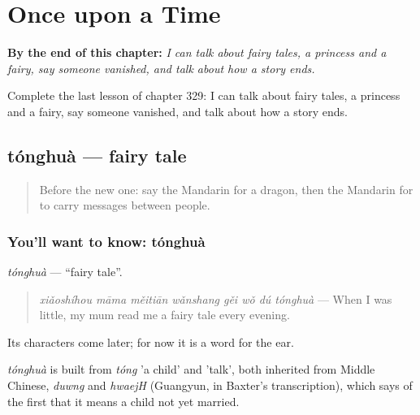 
\chapter{Once upon a Time}
\label{ch:zh-once-upon-a-time}

\begin{chapteropening}
\textbf{By the end of this chapter:} \emph{I can talk about fairy tales, a princess and a fairy, say someone vanished, and talk about how a story ends.}

Complete the last lesson of chapter 329: I can talk about fairy tales, a princess and a fairy, say someone vanished, and talk about how a story ends.
\end{chapteropening}

\section[tónghuà]{tónghuà — fairy tale}

\label{lesson:ZH-C329-tonghua}



\begin{quote}
Before the new one: say the Mandarin for a dragon, then the Mandarin for to carry messages between people.
\end{quote}

\subsection*{You'll want to know: tónghuà}
\emph{tónghuà} — \textquotedblleft{}fairy tale\textquotedblright{}.

\begin{quote}
\emph{xiǎoshíhou māma měitiān wǎnshang gěi wǒ dú tónghuà} — When I was little, my mum read me a fairy tale every evening.
\end{quote}

Its characters come later; for now it is a word for the ear.

\begin{cousinweb}
\emph{tónghuà} is built from \emph{tóng} 'a child' and  'talk', both inherited from Middle Chinese, \emph{duwng} and \emph{hwaejH} (Guangyun, in Baxter's transcription), which says of the first that it means a child not yet married.
\end{cousinweb}

